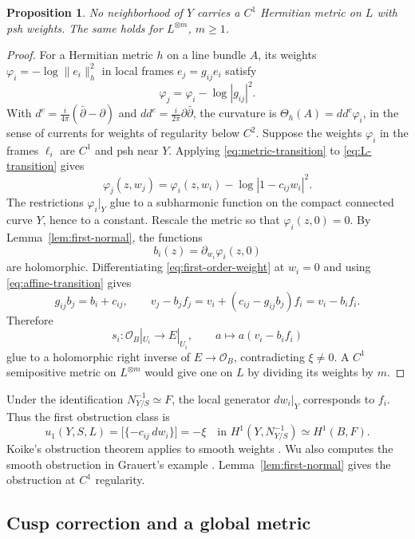 \documentclass[11pt]{amsart}
\newtheorem{proposition}[theorem]{Proposition}
\theoremstyle{definition}
\theoremstyle{remark}
\numberwithin{equation}{section}
\newcommand{\OO}{\mathcal O}
\newcommand{\ddc}{dd^c}
\newcommand{\barp}{\bar\partial}
\begin{document}
\begin{proposition}\label{prop:no-metric}
No neighborhood of $Y$ carries a $C^1$ Hermitian metric on $L$
with psh weights. The same holds for $L^{\otimes m}$, $m\ge1$.
\end{proposition}
\begin{proof}
For a Hermitian metric $h$ on a line bundle $A$, its weights
$\varphi_i=-\log\|e_i\|_h^2$ in local frames $e_j=g_{ij}e_i$
satisfy
\begin{equation}\label{eq:metric-transition}
 \varphi_j=\varphi_i-\log|g_{ij}|^2.
\end{equation}
With $d^c=\tfrac{i}{4\pi}(\barp-\partial)$ and
$\ddc=\tfrac{i}{2\pi}\partial\barp$, the curvature is
$\Theta_h(A)=\ddc\varphi_i$, in the sense of currents for weights
of regularity below $C^2$.
Suppose the weights $\varphi_i$ in the frames $\ell_i$ are $C^1$
and psh near $Y$. Applying \eqref{eq:metric-transition} to
\eqref{eq:L-transition} gives
\begin{equation}\label{eq:first-order-weight}
 \varphi_j(z,w_j)=\varphi_i(z,w_i)-\log|1-c_{ij}w_i|^2.
\end{equation}
The restrictions $\varphi_i|_Y$ glue to a subharmonic function
on the compact connected curve $Y$, hence to a constant. Rescale
the metric so that $\varphi_i(z,0)=0$. By
Lemma~\ref{lem:first-normal}, the functions
\[
 b_i(z)=\partial_{w_i}\varphi_i(z,0)
\]
are holomorphic. Differentiating \eqref{eq:first-order-weight} at
$w_i=0$ and using \eqref{eq:affine-transition} gives
\[
 g_{ij}b_j=b_i+c_{ij},\qquad
 v_j-b_jf_j=v_i+(c_{ij}-g_{ij}b_j)f_i=v_i-b_if_i.
\]
Therefore
\[
 s_i:\OO_B|_{U_i}\longrightarrow E|_{U_i},\qquad
 a\longmapsto a(v_i-b_if_i)
\]
glue to a holomorphic right inverse of $E\to\OO_B$,
contradicting $\xi\ne0$. A $C^1$ semipositive metric on
$L^{\otimes m}$ would give one on $L$ by dividing its weights
by $m$.
\end{proof}

Under the identification $N_{Y/S}^{-1}\simeq F$, the local generator
$dw_i|_Y$ corresponds to $f_i$. Thus the first obstruction class is
\[
 u_1(Y,S,L)=\bigl[\{-c_{ij}\,dw_i\}\bigr]=-\xi
 \quad\text{in }H^1(Y,N_{Y/S}^{-1})\simeq H^1(B,F).
\]
Koike's obstruction theorem applies to smooth weights
\cite[Theorem~1.4]{Koike2021}. Wu also computes the smooth
obstruction in Grauert's example \cite[Example~3.7]{Wu2026}.
Lemma~\ref{lem:first-normal} gives the obstruction at $C^1$ regularity.

\subsection{Cusp correction and a global metric}\label{sec:cusp}
\end{document}
